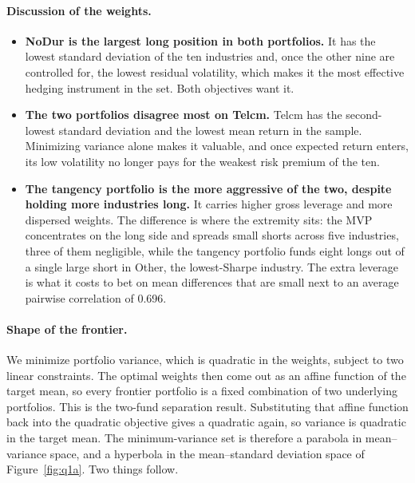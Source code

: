 \documentclass[11pt]{article}
\begin{document}
\paragraph{Discussion of the weights.}
\begin{itemize}
\setlength{\itemsep}{6pt}\setlength{\parskip}{0pt}

\item \textbf{NoDur is the largest long position in both portfolios.} It has
the lowest standard deviation of the ten industries and, once the other nine
are controlled for, the lowest residual volatility, which makes it the most
effective hedging instrument in the set. Both objectives want it.

\item \textbf{The two portfolios disagree most on Telcm.} Telcm has the
second-lowest standard deviation and the lowest mean return in the sample.
Minimizing variance alone makes it valuable, and once expected return enters,
its low volatility no longer pays for the weakest risk premium of the ten.

\item \textbf{The tangency portfolio is the more aggressive of the two,
despite holding more industries long.} It carries higher gross leverage and
more dispersed weights. The difference is where the extremity sits: the MVP
concentrates on the long side and spreads small shorts across five industries,
three of them negligible, while the tangency portfolio funds eight longs out
of a single large short in Other, the lowest-Sharpe industry. The extra
leverage is what it costs to bet on mean differences that are small next to an
average pairwise correlation of 0.696.

\end{itemize}

\paragraph{Shape of the frontier.} We minimize portfolio variance, which is
quadratic in the weights, subject to two linear constraints. The optimal
weights then come out as an affine function of the target mean, so every
frontier portfolio is a fixed combination of two underlying portfolios. This
is the two-fund separation result. Substituting that affine function back into
the quadratic objective gives a quadratic again, so variance is quadratic in
the target mean. The minimum-variance set is therefore a parabola in
mean--variance space, and a hyperbola in the mean--standard deviation space of
Figure~\ref{fig:q1a}. Two things follow.
\end{document}
